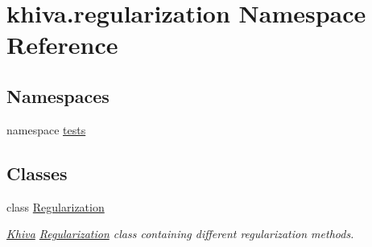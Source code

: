 \hypertarget{namespacekhiva_1_1regularization}{}\section{khiva.\+regularization Namespace Reference}
\label{namespacekhiva_1_1regularization}
\subsection*{Namespaces}
\begin{DoxyCompactItemize}
\item 
namespace \mbox{\hyperlink{namespacekhiva_1_1regularization_1_1tests}{tests}}
\end{DoxyCompactItemize}
\subsection*{Classes}
\begin{DoxyCompactItemize}
\item 
class \mbox{\hyperlink{classkhiva_1_1regularization_1_1_regularization}{Regularization}}
\begin{DoxyCompactList}\small\item\em \mbox{\hyperlink{classkhiva_1_1_khiva}{Khiva}} \mbox{\hyperlink{classkhiva_1_1regularization_1_1_regularization}{Regularization}} class containing different regularization methods. \end{DoxyCompactList}\end{DoxyCompactItemize}
